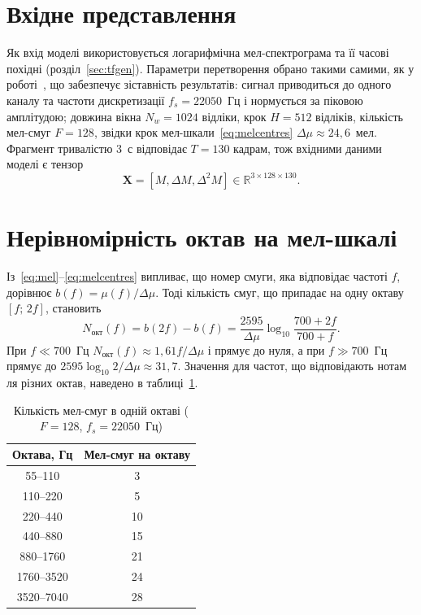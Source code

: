 \section{Вхідне представлення}
\label{sec:tf}

Як вхід моделі використовується логарифмічна мел-спектрограма та її
часові похідні (розділ~\ref{sec:tfgen}). Параметри перетворення обрано
такими самими, як у роботі~\cite{han2017}, що забезпечує зіставність
результатів: сигнал приводиться до одного каналу та частоти дискретизації
$f_s = 22050$~Гц і нормується за піковою амплітудою; довжина вікна
$N_w = 1024$ відліки, крок $H = 512$ відліків, кількість мел-смуг
$F = 128$, звідки крок мел-шкали~\eqref{eq:melcentres}
$\Delta\mu \approx 24{,}6$~мел. Фрагмент тривалістю 3~с відповідає
$T = 130$ кадрам, тож вхідними даними моделі є тензор
\begin{equation}
    \mathbf{X} = [M, \Delta M, \Delta^2 M] \in \mathbb{R}^{3 \times 128 \times 130}.
\end{equation}

\section{Нерівномірність октав на мел-шкалі}
\label{sec:octaves}

Із~\eqref{eq:mel}--\eqref{eq:melcentres} випливає, що номер смуги, яка
відповідає частоті $f$, дорівнює $b(f) = \mu(f) / \Delta\mu$. Тоді
кількість смуг, що припадає на одну октаву $[f;\, 2f]$, становить
\begin{equation}
    N_{\text{окт}}(f) = b(2f) - b(f)
    = \frac{2595}{\Delta\mu} \log_{10} \frac{700 + 2f}{700 + f}.
    \label{eq:octwidth}
\end{equation}
При $f \ll 700$~Гц $N_{\text{окт}}(f) \approx 1{,}61 f / \Delta\mu$ і
прямує до нуля, а при $f \gg 700$~Гц прямує до
$2595 \log_{10} 2 / \Delta\mu \approx 31{,}7$. Значення для частот, що
відповідають нотам ля різних октав, наведено в таблиці~\ref{tab:octaves}.

\begin{table}[H]
\centering
\caption{Кількість мел-смуг в одній октаві ($F = 128$, $f_s = 22050$~Гц)}
\label{tab:octaves}
\begin{tabular}{|c|c|}
\hline
Октава, Гц & Мел-смуг на октаву \\
\hline
55--110     & 3 \\
110--220    & 5 \\
220--440    & 10 \\
440--880    & 15 \\
880--1760   & 21 \\
1760--3520  & 24 \\
3520--7040  & 28 \\
\hline
\end{tabular}
\end{table}


